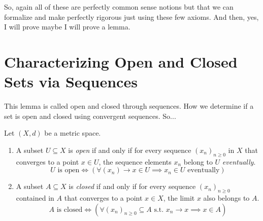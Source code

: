 \begin{spoken-clean}[00:07:55 - 00:08:52]
So, again all of these are perfectly common sense notions but that we can formalize and make perfectly rigorous just using these few axioms. And then, yes, I will prove maybe I will prove a lemma. 
\end{spoken-clean}


\section{Characterizing Open and Closed Sets via Sequences}

\begin{spoken-clean}[00:08:52 - 00:10:12]
This lemma is called open and closed through sequences. How we determine if a set is open and closed using convergent sequences. So... 
\end{spoken-clean}

\begin{math-stroke}
\setcounter{theorem}{47}
\begin{lemma}\label{lem:open-closed-sequences}
Let $(X, d)$ be a metric space.
\begin{enumerate}
    \setcounter{enumi}{0} \item A subset $U \subseteq X$ is \emph{open} if and only if for every sequence $(x_n)_{n \ge 0}$ in $X$ that converges to a point $x \in U$, the sequence elements $x_n$ belong to $U$ \emph{eventually}.
    \[ U \text{ is open} \iff \left( \forall (x_n) \to x \in U \implies x_n \in U \text{ eventually} \right) \]
    \item A subset $A \subseteq X$ is \emph{closed} if and only if for every sequence $(x_n)_{n \ge 0}$ contained in $A$ that converges to a point $x \in X$, the limit $x$ also belongs to $A$.
    \[ A \text{ is closed} \iff \left( \forall (x_n)_{n \ge 0} \subseteq A \text{ s.t. } x_n \to x \implies x \in A \right) \]
\end{enumerate}
\end{lemma}
\end{math-stroke}

